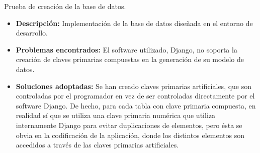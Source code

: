 \item Prueba de creación de la base de datos.
  \begin{itemize}
    \item \textbf{Descripción:} Implementación de la base de datos diseñada
    en el entorno de desarrollo.
    \item \textbf{Problemas encontrados:} El software utilizado, Django, no
    soporta la creación de claves primarias compuestas en la generación de su
    modelo de datos.
    \item \textbf{Soluciones adoptadas:} Se han creado claves primarias
    artificiales, que son controladas por el programador en vez de ser
    controladas directamente por el software Django. De hecho, para cada tabla
    con clave primaria compuesta, en realidad sí que se utiliza una clave
    primaria numérica que utiliza internamente Django para evitar duplicaciones
    de elementos, pero ésta se obvia en la codificación de la aplicación, donde
    los distintos elementos son accedidos a través de las claves primarias
    artificiales.
  \end{itemize}
